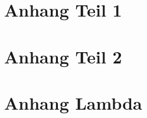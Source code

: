 \documentclass[12pt,titlepage,twoside]{article}
\begin{document}
\clearpage
\setcounter{page}{0}

\renewcommand{\thepage}{A-\arabic{page}}

\begin{appendices}

\section{Anhang Teil 1}

\section{Anhang Teil 2}


\section{Anhang Lambda}


\end{appendices}


\end{document}
